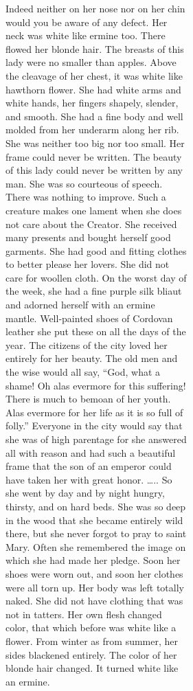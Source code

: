 \documentclass[
  letterpaper,
  DIV=11,
  numbers=noendperiod,
  oneside]{scrreprt}
\begin{document}
\begin{figure}
\begin{figure}
\begin{figure}
\begin{minipage}{0.20\linewidth}
Indeed neither on her nose nor on her chin would you be aware of any
defect. Her neck was {white like ermine} too. There flowed her {blonde}
hair. The breasts of this lady were no smaller than apples. Above the
cleavage of her chest, it was {white like hawthorn flower}. She had
{white arms} and {white hands}, her fingers shapely, slender, and
smooth. She had a fine body and well molded from her underarm along her
rib. She was neither too big nor too small. Her frame could never be
written. The beauty of this lady could never be written by any man. She
was so courteous of speech. There was nothing to improve. Such a
creature makes one lament when she does not care about the Creator. She
received many presents and bought herself good garments. She had good
and fitting clothes to better please her lovers. She did not care for
woollen cloth. On the worst day of the week, she had a fine {purple
silk} bliaut and adorned herself with an ermine mantle. {Well-painted}
shoes of Cordovan leather she put these on all the days of the year. The
citizens of the city loved her entirely for her beauty. The old men and
the wise would all say, ``God, what a shame! Oh alas evermore for this
suffering! There is much to bemoan of her youth. Alas evermore for her
life as it is so full of folly.'' Everyone in the city would say that
she was of high parentage for she answered all with reason and had such
a beautiful frame that the son of an emperor could have taken her with
great honor. \ldots.. So she went by day and by night hungry, thirsty,
and on hard beds. She was so deep in the wood that she became entirely
wild there, but she never forgot to pray to saint Mary. Often she
remembered the image on which she had made her pledge. Soon her shoes
were worn out, and soon her clothes were all torn up. {Her body was left
totally naked.} {She did not have clothing that was not in tatters.} Her
own flesh {changed color}, that which before was {white like a flower}.
From winter as from summer, her sides {blackened} entirely. {The color
of her blonde hair changed.} {It turned white like an ermine}.


\end{minipage}
\end{figure}
\end{figure}
\end{figure}
\end{document}
